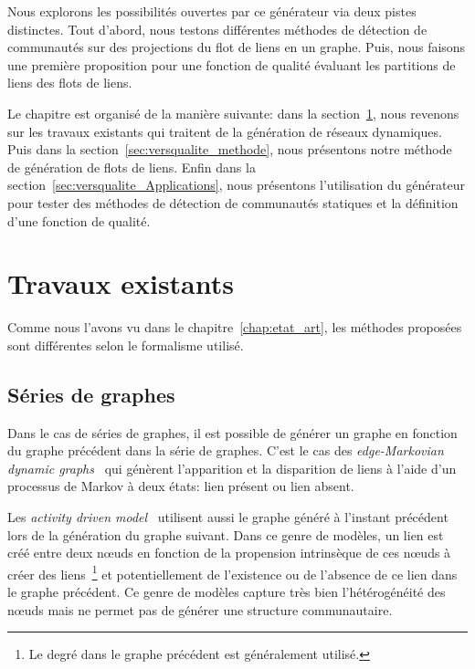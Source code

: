 \bigskip
Nous explorons les possibilités ouvertes par ce générateur via deux pistes distinctes.
Tout d'abord, nous testons différentes méthodes de détection de communautés sur des projections du flot de liens en un graphe.
Puis, nous faisons une première proposition pour une fonction de qualité évaluant les partitions de liens des flots de liens.

\bigskip

Le chapitre est organisé de la manière suivante: dans la section~\ref{sec:versqualite_existant}, nous revenons sur les travaux existants qui traitent de la génération de réseaux dynamiques.
Puis dans la section~\ref{sec:versqualite_methode}, nous présentons notre méthode de génération de flots de liens.
Enfin dans la section~\ref{sec:versqualite_Applications}, nous présentons l'utilisation du générateur pour tester des méthodes de détection de communautés statiques et la définition d'une fonction de qualité.

\section{Travaux existants}
\label{sec:versqualite_existant}

Comme nous l'avons vu dans le chapitre~\ref{chap:etat_art}, les méthodes proposées sont différentes selon le formalisme utilisé.

\subsection{Séries de graphes}
Dans le cas de séries de graphes, il est possible de générer un graphe en fonction du graphe précédent dans la série de graphes.
C'est le cas des \emph{edge-Markovian dynamic graphs}~\cite{Clementi2008} qui génèrent l'apparition et la disparition de liens à l'aide d'un processus de Markov à deux états: lien présent ou lien absent.

Les \emph{activity driven model}~\cite{Perra2012,Laurent2015a,Moinet2015} utilisent aussi le graphe généré à l'instant précédent lors de la génération du graphe suivant.
Dans ce genre de modèles, un lien est créé entre deux n\oe{}uds en fonction de la propension intrinsèque de ces n\oe{}uds à créer des liens~\footnote{Le degré dans le graphe précédent est généralement utilisé.} et potentiellement de l'existence ou de l'absence de ce lien dans le graphe précédent.
Ce genre de modèles capture très bien l'hétérogénéité des n\oe{}uds mais ne permet pas de générer une structure communautaire.


